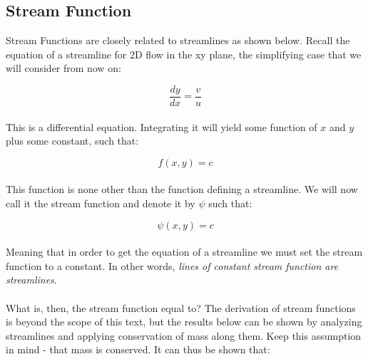 \documentclass[11pt]{article}
\begin{document}
\subsection{Stream Function}
Stream Functions are closely related to streamlines as shown below. Recall the equation of a streamline for 2D flow in the xy plane, the simplifying case that we will consider from now on:

\begin{equation*}
    \frac{dy}{dx} = \frac{v}{u}
\end{equation*} \\
\noindent
This is a differential equation. Integrating it will yield some function of $x$ and $y$ plus some constant, such that:

\begin{equation*}
    f(x,y) = c
\end{equation*} \\
\noindent
This function is none other than the function defining a streamline. We will now call it the stream function and denote it by $\psi$ such that:

\begin{equation*}
    \psi(x,y) = c
\end{equation*} \\
\noindent
Meaning that in order to get the equation of a streamline we must set the stream function to a constant. In other words, \emph{lines of constant stream function are streamlines}.\\ \\
\noindent
What is, then, the stream function equal to? The derivation of stream functions is beyond the scope of this text, but the results below can be shown by analyzing streamlines and applying conservation of mass along them. Keep this assumption in mind - that mass is conserved. It can thus be shown that: \\
\end{document}
